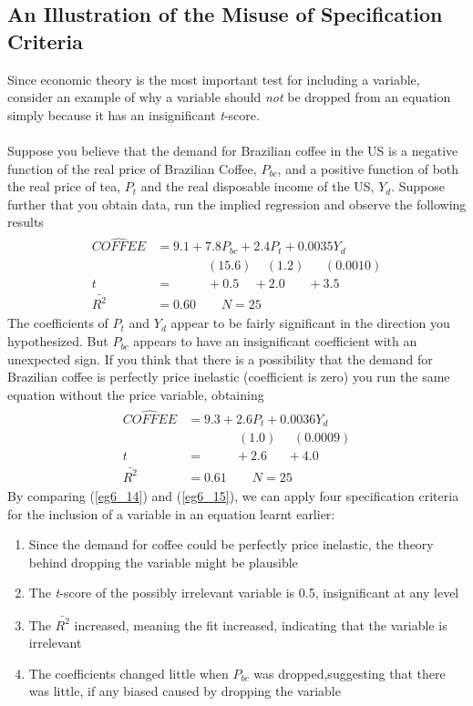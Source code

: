 \documentclass[11pt]{article}
\begin{document}
\subsection{An Illustration of the Misuse of Specification Criteria}
Since economic theory is the most important test for including a variable, consider an example of why a variable should \textit{not} be dropped from an equation simply because it has an insignificant \textit{t}-score.\\ \\
Suppose you believe that the demand for Brazilian coffee in the US is a negative function of the real price of Brazilian Coffee, $P_{bc}$, and a positive function of both the real price of tea, $P_t$ and the real disposable income of the US, $Y_d$. Suppose further that you obtain data, run the implied regression and observe the following results
\begin{align}
\label{eg6_14}
\begin{split}
\widehat{COFFEE} &= 9.1 + {7.8P_{bc}} + {2.4P_t} + {0.0035Y_d}\\
&\>\>\>\>\>\>\>\>\>\>\>\>\>\>\>\>\>\> (15.6) 
\>\>\>\>\> (1.2)
\>\>\>\>\>\>\>(0.0010)\\
t&=\>\>\>\>\>\>\>\>\>\>\>\> +0.5 
\>\>\>\>\> +2.0
\>\>\>\>\>\>\>\>+3.5\\
\bar{R^2}&= 0.60 \quad\quad N=25
\end{split}
\end{align}
The coefficients of $P_t$ and $Y_d$ appear to be fairly significant in the direction you hypothesized. But $P_{bc}$ appears to have an insignificant coefficient with an unexpected sign. If you think that there is a possibility that the demand for Brazilian coffee is perfectly price inelastic (coefficient is zero) you run the same equation without the price variable, obtaining
\begin{align}
\label{eg6_15}
\begin{split}
\widehat{COFFEE} &= 9.3 + {2.6P_t} + {0.0036Y_d}\\
&\>\>\>\>\>\>\>\>\>\>\>\>\>\>\>\>\>\> (1.0) 
\>\>\>\>\>\> (0.0009)\\
t&=\>\>\>\>\>\>\>\>\>\>\> +2.6 
\>\>\>\>\>\>\> +4.0\\
\bar{R^2}&= 0.61 \quad\quad N=25
\end{split}
\end{align}
By comparing (\ref{eg6_14}) and (\ref{eg6_15}), we can apply four specification criteria for the inclusion of a variable in an equation learnt earlier:
\begin{enumerate}
\item Since the demand for coffee could be perfectly price inelastic, the theory behind dropping the variable might be plausible
\item The \textit{t}-score of the possibly irrelevant variable is 0.5, insignificant at any level
\item The $\bar{R^2}$ increased, meaning the fit increased, indicating that the variable is irrelevant
\item The coefficients changed little when $P_{bc}$ was dropped,suggesting that there was little, if any biased caused by dropping the variable
\end{enumerate}
\end{document}
